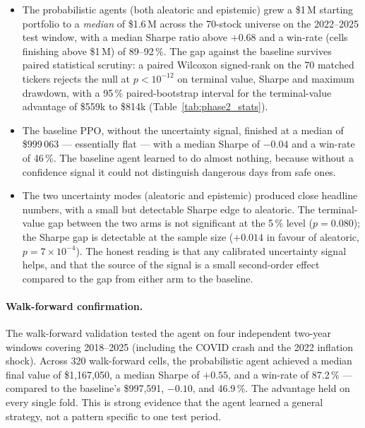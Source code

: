 \begin{itemize}[leftmargin=*]
  \item The probabilistic agents (both aleatoric and epistemic) grew a \$1\,M starting portfolio to a \emph{median} of \$1.6\,M across the 70-stock universe on the 2022--2025 test window, with a median Sharpe ratio above $+0.68$ and a win-rate (cells finishing above \$1\,M) of 89--92\,\%. The gap against the baseline survives paired statistical scrutiny: a paired Wilcoxon signed-rank on the 70 matched tickers rejects the null at $p < 10^{-12}$ on terminal value, Sharpe and maximum drawdown, with a 95\,\% paired-bootstrap interval for the terminal-value advantage of \$559k to \$814k (Table~\ref{tab:phase2_stats}).
  \item The baseline PPO, without the uncertainty signal, finished at a median of \$999\,063 --- essentially flat --- with a median Sharpe of $-0.04$ and a win-rate of 46\,\%. The baseline agent learned to do almost nothing, because without a confidence signal it could not distinguish dangerous days from safe ones.
  \item The two uncertainty modes (aleatoric and epistemic) produced close headline numbers, with a small but detectable Sharpe edge to aleatoric. The terminal-value gap between the two arms is not significant at the 5\,\% level ($p = 0.080$); the Sharpe gap is detectable at the sample size ($+0.014$ in favour of aleatoric, $p = 7 \times 10^{-4}$). The honest reading is that any calibrated uncertainty signal helps, and that the source of the signal is a small second-order effect compared to the gap from either arm to the baseline.
\end{itemize}

\paragraph{Walk-forward confirmation.} The walk-forward validation tested the agent on four independent two-year windows covering 2018--2025 (including the COVID crash and the 2022 inflation shock). Across 320 walk-forward cells, the probabilistic agent achieved a median final value of \$1,167,050, a median Sharpe of $+0.55$, and a win-rate of 87.2\,\% --- compared to the baseline's \$997,591, $-0.10$, and 46.9\,\%. The advantage held on every single fold. This is strong evidence that the agent learned a general strategy, not a pattern specific to one test period.

